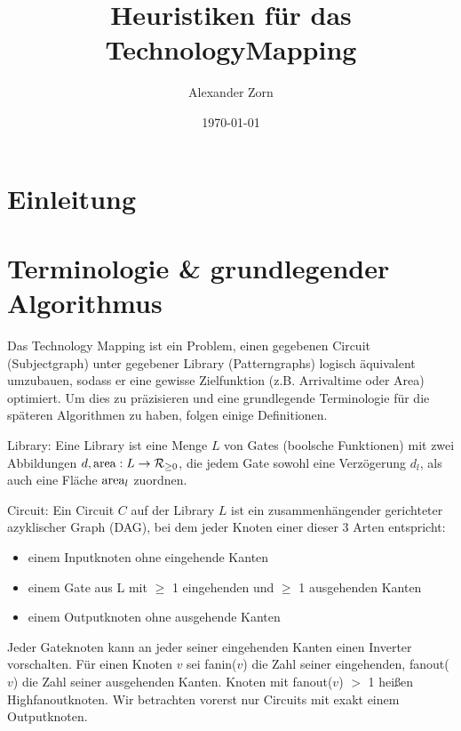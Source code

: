 \documentclass[11pt, a4paper, german]{article}
\author{Alexander Zorn}
\date{\today}
\title{Heuristiken f\"ur das TechnologyMapping}
\begin{document}
\maketitle

\tableofcontents
\newpage

\section{Einleitung}

\section{Terminologie \& grundlegender Algorithmus}


Das Technology Mapping ist ein Problem, einen gegebenen Circuit (Subjectgraph) unter gegebener Library (Patterngraphs) logisch \"aquivalent umzubauen, sodass er eine gewisse Zielfunktion (z.B. Arrivaltime oder Area) optimiert. Um dies zu pr\"azisieren und eine grundlegende Terminologie für die sp\"ateren Algorithmen zu haben, folgen einige Definitionen.

\begin{definition}{Library: }Eine Library ist eine Menge $L$ von Gates (boolsche Funktionen) mit zwei Abbildungen $d, \text{area}: L \to \mathcal{R}_{\geq 0}$, die jedem Gate sowohl eine Verzögerung $d_l$, als auch eine Fl\"ache $\text{area}_l$ zuordnen.
\end{definition}

\begin{figure}
 
\end{figure}


\begin{definition}{Circuit: }Ein Circuit $C$ auf der Library $L$ ist ein zusammenhängender gerichteter azyklischer Graph (DAG), bei dem jeder Knoten einer dieser 3 Arten entspricht:
 \begin{itemize}
  \item einem Inputknoten ohne eingehende Kanten
  \item einem Gate aus L mit $\geq$ 1 eingehenden und $\geq$ 1 ausgehenden Kanten
  \item einem Outputknoten ohne ausgehende Kanten
 \end{itemize}
 Jeder Gateknoten kann an jeder seiner eingehenden Kanten einen Inverter vorschalten.
 Für einen Knoten $v$ sei fanin($v$) die Zahl seiner eingehenden, fanout($v$) die Zahl seiner ausgehenden Kanten. Knoten mit fanout($v$) $>$ 1 heißen Highfanoutknoten. Wir betrachten vorerst nur Circuits mit exakt einem Outputknoten.
\end{definition}
\end{document}
